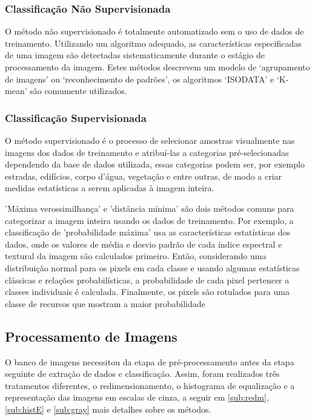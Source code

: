 \documentclass{article}
\begin{document}
\subsubsection{Classificação Não Supervisionada}

O método não supervisionado é totalmente automatizado sem o uso de dados de treinamento. Utilizando um algoritmo adequado, as características especificadas de uma imagem são detectadas sistematicamente durante o estágio de processamento da imagem. Estes métodos descrevem um modelo de ‘agrupamento de imagens’ ou ‘reconhecimento de padrões’, os algoritmos ‘ISODATA’ e ‘K-mean’ são comumente utilizados.

\subsubsection{Classificação Supervisionada}

O método supervisionado é o processo de selecionar amostras visualmente nas imagens dos dados de treinamento e atribuí-las a categorias pré-selecionadas dependendo da base de dados utilizada, essas categorias podem ser, por exemplo estradas, edifícios, corpo d'água, vegetação e entre outras, de modo a criar medidas estatísticas a serem aplicadas à imagem inteira. 

'Máxima verossimilhança' e 'distância mínima' são dois métodos comuns para categorizar a imagem inteira usando os dados de treinamento. Por exemplo, a classificação de 'probabilidade máxima' usa as características estatísticas dos dados, onde os valores de média e desvio padrão de cada índice espectral e textural da imagem são calculados primeiro. Então, considerando uma distribuição normal para os pixels em cada classe e usando algumas estatísticas clássicas e relações probabilísticas, a probabilidade de cada pixel pertencer a classes individuais é calculada. Finalmente, os pixels são rotulados para uma classe de recursos que mostram a maior probabilidade

\subsection{Processamento de Imagens}
\label{sub:process_img}
O banco de imagens necessitou da etapa de pré-processamento antes da etapa seguinte de extração de dados e classificação. Assim, foram realizados três tratamentos diferentes, o redimensionamento, o histograma de equalização e a representação das imagens em escalas de cinza, a seguir em \ref{sub:redm}, \ref{sub:histE}  e \ref{sub:gray} mais detalhes sobre os métodos.
\end{document}
